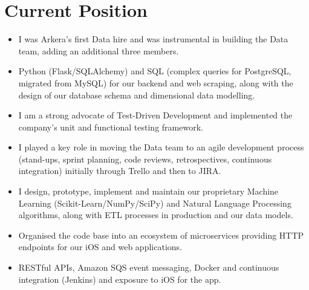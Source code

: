 \documentclass[11pt,a4paper,sans]{moderncv}        %
\begin{document}
\section{Current Position}
\vspace*{-0.15cm}
{
\begin{itemize}%
\item I was Arkera's first Data hire and was instrumental in building the Data team, adding an additional three members.
\item Python (Flask/SQLAlchemy) and SQL (complex queries for PostgreSQL, migrated from MySQL) for our backend and web scraping, along with the design of our database schema and dimensional data modelling.
\item I am a strong advocate of Test-Driven Development and implemented the company's unit and functional testing framework. 
\item I played a key role in moving the Data team to an agile development process (stand-ups, sprint planning, code reviews, retrospectives, continuous integration) initially through Trello and then to JIRA.
\item I design, prototype, implement and maintain our proprietary Machine Learning (Scikit-Learn/NumPy/SciPy) and Natural Language Processing algorithms, along with ETL processes in production and our data models.
\item Organised the code base into an ecosystem of microservices providing HTTP endpoints for our iOS and web applications.
\item RESTful APIs, Amazon SQS event messaging, Docker and continuous integration (Jenkins) and exposure to iOS for the app.
\end{itemize}}
\vspace*{-0.5cm}
\end{document}
